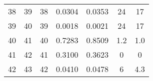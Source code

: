 \begin{table}
\begin{adjustbox}{width=0.95\textwidth,center=\textwidth}
\begin{tabular}{ccccccc}
38                                                        & 39                                                          & 38                                                  & 0.0304                                                                    & 0.0353                                                                    & 24                                                                          & 17                                                                               \\
39                                                        & 40                                                          & 39                                                  & 0.0018                                                                    & 0.0021                                                                    & 24                                                                          & 17                                                                               \\
40                                                        & 41                                                          & 40                                                  & 0.7283                                                                    & 0.8509                                                                    & 1.2                                                                         & 1.0                                                                              \\
41                                                        & 42                                                          & 41                                                  & 0.3100                                                                    & 0.3623                                                                    & 0                                                                           & 0                                                                                \\
42                                                        & 43                                                          & 42                                                  & 0.0410                                                                    & 0.0478                                                                    & 6                                                                           & 4.3                                                                              \\

\end{tabular}
\end{adjustbox}
\end{table}
